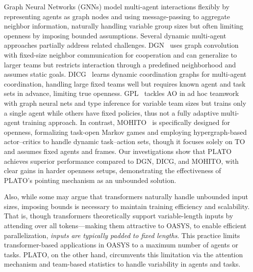 



Graph Neural Networks (GNNs) \cite{gnn} model multi-agent interactions flexibly by representing agents as graph nodes and using message-passing to aggregate neighbor information, naturally handling variable group sizes but often limiting openness by imposing bounded assumptions. Several dynamic multi-agent approaches partially address related challenges. DGN~\cite{dgn} uses graph convolution with fixed-size neighbor communication for cooperation and can generalize to larger teams but restricts interaction through a predefined neighborhood and assumes static goals. DICG~\cite{dicg} learns dynamic coordination graphs for multi-agent coordination, handling large fixed teams well but requires known agent and task sets in advance, limiting true openness. GPL~\cite{gpl} tackles AO in ad hoc teamwork with graph neural nets and type inference for variable team sizes but trains only a single agent while others have fixed policies, thus not a fully adaptive multi-agent training approach. In contrast, MOHITO~\cite{anilmohito} is specifically designed for openness, formalizing task-open Markov games and employing hypergraph-based actor–critics to handle dynamic task–action sets, though it focuses solely on TO and assumes fixed agents and frames. Our investigations show that PLATO achieves superior performance compared to DGN, DICG, and MOHITO, with clear gains in harder openness setups, demonstrating the effectiveness of PLATO's pointing mechanism as an unbounded solution.

Also, while some may argue that transformers \cite{vaswani2017attention} naturally handle unbounded input sizes, imposing bounds is necessary to maintain training efficiency and scalability. That is, though transformers theoretically support variable-length inputs by attending over all tokens---making them attractive to OASYS, to enable efficient parallelization, \emph{inputs are typically padded to fixed lengths}.  This practice limits transformer-based applications in OASYS to a maximum number of agents or tasks. PLATO, on the other hand, circumvents this limitation via the attention mechanism and team-based statistics to handle variability in agents and tasks.  

